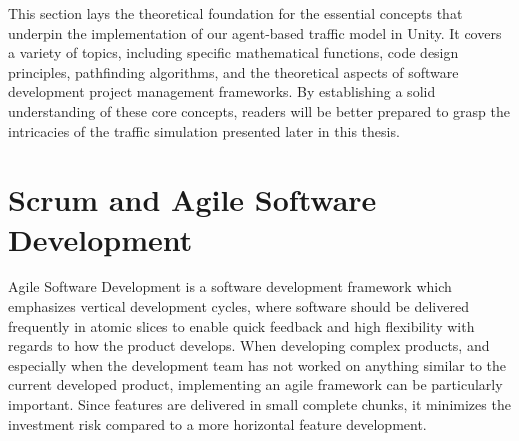
This section lays the theoretical foundation for the essential concepts that underpin the implementation of our agent-based traffic model in Unity. It covers a variety of topics, including specific mathematical functions, code design principles, pathfinding algorithms, and the theoretical aspects of software development project management frameworks. By establishing a solid understanding of these core concepts, readers will be better prepared to grasp the intricacies of the traffic simulation presented later in this thesis.









\section{Scrum and Agile Software Development}
    Agile Software Development is a software development framework which emphasizes vertical development cycles, where software should be delivered frequently in atomic slices to enable quick feedback and high flexibility with regards to how the product develops. When developing complex products, and especially when the development team has not worked on anything similar to the current developed product, implementing an agile framework can be particularly important. Since features are delivered in small complete chunks, it minimizes the investment risk compared to a more horizontal feature development. 






